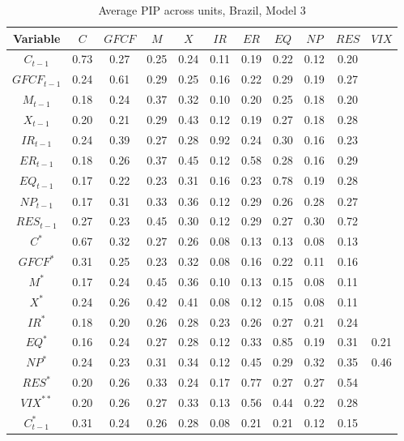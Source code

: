 \documentclass[a4paper, twoside]{templates/ociamthesis}
\begin{document}
\begin{table}[!ht]

\caption{\label{tab:Table55BR3}Average PIP across units, Brazil, Model 3}
\centering
\fontsize{6}{8}\selectfont
\begin{tabular}[t]{ccccccccccc}
\toprule
Variable & $C$ & $GFCF$ & $M$ & $X$ & $IR$ & $ER$ & $EQ$ & $NP$ & $RES$ & $VIX$\\
\midrule
$C_{t-1}$ & 0.73 & 0.27 & 0.25 & 0.24 & 0.11 & 0.19 & 0.22 & 0.12 & 0.20 & \\
$GFCF_{t-1}$ & 0.24 & 0.61 & 0.29 & 0.25 & 0.16 & 0.22 & 0.29 & 0.19 & 0.27 & \\
$M_{t-1}$ & 0.18 & 0.24 & 0.37 & 0.32 & 0.10 & 0.20 & 0.25 & 0.18 & 0.20 & \\
$X_{t-1}$ & 0.20 & 0.21 & 0.29 & 0.43 & 0.12 & 0.19 & 0.27 & 0.18 & 0.28 & \\
$IR_{t-1}$ & 0.24 & 0.39 & 0.27 & 0.28 & 0.92 & 0.24 & 0.30 & 0.16 & 0.23 & \\
$ER_{t-1}$ & 0.18 & 0.26 & 0.37 & 0.45 & 0.12 & 0.58 & 0.28 & 0.16 & 0.29 & \\
$EQ_{t-1}$ & 0.17 & 0.22 & 0.23 & 0.31 & 0.16 & 0.23 & 0.78 & 0.19 & 0.28 & \\
$NP_{t-1}$ & 0.17 & 0.31 & 0.33 & 0.36 & 0.12 & 0.29 & 0.26 & 0.28 & 0.27 & \\
$RES_{t-1}$ & 0.27 & 0.23 & 0.45 & 0.30 & 0.12 & 0.29 & 0.27 & 0.30 & 0.72 & \\
$C^*$ & 0.67 & 0.32 & 0.27 & 0.26 & 0.08 & 0.13 & 0.13 & 0.08 & 0.13 & \\
$GFCF^*$ & 0.31 & 0.25 & 0.23 & 0.32 & 0.08 & 0.16 & 0.22 & 0.11 & 0.16 & \\
$M^*$ & 0.17 & 0.24 & 0.45 & 0.36 & 0.10 & 0.13 & 0.15 & 0.08 & 0.11 & \\
$X^*$ & 0.24 & 0.26 & 0.42 & 0.41 & 0.08 & 0.12 & 0.15 & 0.08 & 0.11 & \\
$IR^*$ & 0.18 & 0.20 & 0.26 & 0.28 & 0.23 & 0.26 & 0.27 & 0.21 & 0.24 & \\
$EQ^*$ & 0.16 & 0.24 & 0.27 & 0.28 & 0.12 & 0.33 & 0.85 & 0.19 & 0.31 & 0.21\\
$NP^*$ & 0.24 & 0.23 & 0.31 & 0.34 & 0.12 & 0.45 & 0.29 & 0.32 & 0.35 & 0.46\\
$RES^*$ & 0.20 & 0.26 & 0.33 & 0.24 & 0.17 & 0.77 & 0.27 & 0.27 & 0.54 & \\
$VIX^{**}$ & 0.20 & 0.26 & 0.27 & 0.33 & 0.13 & 0.56 & 0.44 & 0.22 & 0.28 & \\
$C^*_{t-1}$ & 0.31 & 0.24 & 0.26 & 0.28 & 0.08 & 0.21 & 0.21 & 0.12 & 0.15 & \\

\end{tabular}
\end{table}
\end{document}
